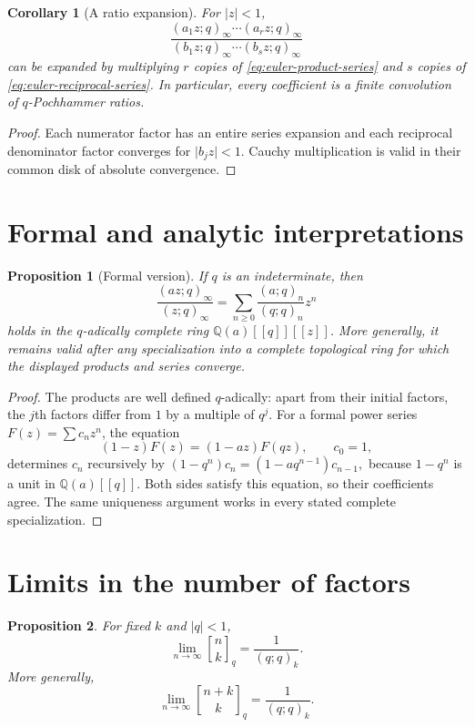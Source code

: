 \documentclass[11pt,oneside,openany]{book}
\newtheorem{proposition}[proposition]{Proposition}
\newtheorem{corollary}[corollary]{Corollary}
\theoremstyle{definition}
\theoremstyle{remark}
\newcommand{\qbinom}[2]{\genfrac{[}{]}{0pt}{}{#1}{#2}_{q}}
\newcommand{\Q}{\mathbb Q}
\newcommand{\abs}[1]{\lvert #1\rvert}
\begin{document}
\begin{corollary}[A ratio expansion]\label{cor:ratio-expansion}
For $\abs z<1$,
\[
 \frac{(a_1z;q)_\infty\cdots(a_rz;q)_\infty}
 {(b_1z;q)_\infty\cdots(b_sz;q)_\infty}
\]
can be expanded by multiplying $r$ copies of \eqref{eq:euler-product-series} and $s$ copies of \eqref{eq:euler-reciprocal-series}.  In particular, every coefficient is a finite convolution of $q$-Pochhammer ratios.
\end{corollary}

\begin{proof}
Each numerator factor has an entire series expansion and each reciprocal denominator factor converges for $\abs{b_jz}<1$.  Cauchy multiplication is valid in their common disk of absolute convergence.
\end{proof}

\section{Formal and analytic interpretations}

\begin{proposition}[Formal version]\label{prop:formal-qbinomial}
If $q$ is an indeterminate, then
\[
 \frac{(az;q)_\infty}{(z;q)_\infty}
 =\sum_{n\ge0}\frac{(a;q)_n}{(q;q)_n}z^n
\]
holds in the $q$-adically complete ring $\Q(a)[[q]][[z]]$.  More generally, it remains valid after any specialization into a complete topological ring for which the displayed products and series converge.
\end{proposition}

\begin{proof}
The products are well defined $q$-adically: apart from their initial factors, the $j$th factors differ from $1$ by a multiple of $q^j$.  For a formal power series $F(z)=\sum c_nz^n$, the equation
\[
 (1-z)F(z)=(1-az)F(qz),\qquad c_0=1,
\]
determines $c_n$ recursively by
\(
 (1-q^n)c_n=(1-aq^{n-1})c_{n-1},
\)
because $1-q^n$ is a unit in $\Q(a)[[q]]$.  Both sides satisfy this equation, so their coefficients agree.  The same uniqueness argument works in every stated complete specialization.
\end{proof}

\section{Limits in the number of factors}

\begin{proposition}\label{prop:fixed-k-limit}
For fixed $k$ and $\abs q<1$,
\[
 \lim_{n\to\infty}\qbinom nk=\frac1{(q;q)_k}.
\]
More generally,
\[
 \lim_{n\to\infty}\qbinom{n+k}{k}=\frac1{(q;q)_k}.
\]
\end{proposition}
\end{document}
